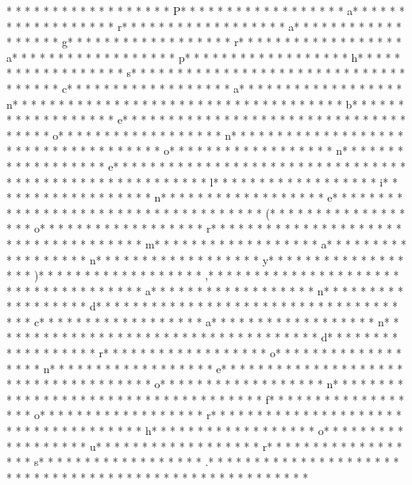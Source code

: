 * * *  * * *  * * *  *  * * *  *  * * *  * P* * *  * * *  * * *  *  * * *  *  * * *  * a* * *  * * *  * * *  *  * * *  *  * * *  * r* * *  * * *  * * *  *  * * *  *  * * *  * a* * *  * * *  * * *  *  * * *  *  * * *  * g* * *  * * *  * * *  *  * * *  *  * * *  * r* * *  * * *  * * *  *  * * *  *  * * *  * a* * *  * * *  * * *  *  * * *  *  * * *  * p* * *  * * *  * * *  *  * * *  *  * * *  * h* * *  * * *  * * *  *  * * *  *  * * *  * s* * *  * * *  * * *  *  * * *  *  * * *  *  * * *  * * *  * * *  *  * * *  *  * * *  * c* * *  * * *  * * *  *  * * *  *  * * *  * a* * *  * * *  * * *  *  * * *  *  * * *  * n* * *  * * *  * * *  *  * * *  *  * * *  *  * * *  * * *  * * *  *  * * *  *  * * *  * b* * *  * * *  * * *  *  * * *  *  * * *  * e* * *  * * *  * * *  *  * * *  *  * * *  *  * * *  * * *  * * *  *  * * *  *  * * *  * o* * *  * * *  * * *  *  * * *  *  * * *  * n* * *  * * *  * * *  *  * * *  *  * * *  *  * * *  * * *  * * *  *  * * *  *  * * *  * o* * *  * * *  * * *  *  * * *  *  * * *  * n* * *  * * *  * * *  *  * * *  *  * * *  * e* * *  * * *  * * *  *  * * *  *  * * *  *  * * *  * * *  * * *  *  * * *  *  * * *  * 
* * *  * * *  * * *  *  * * *  *  * * *  * l* * *  * * *  * * *  *  * * *  *  * * *  * i* * *  * * *  * * *  *  * * *  *  * * *  * n* * *  * * *  * * *  *  * * *  *  * * *  * e* * *  * * *  * * *  *  * * *  *  * * *  *  * * *  * * *  * * *  *  * * *  *  * * *  * (* * *  * * *  * * *  *  * * *  *  * * *  * o* * *  * * *  * * *  *  * * *  *  * * *  * r* * *  * * *  * * *  *  * * *  *  * * *  *  * * *  * * *  * * *  *  * * *  *  * * *  * m* * *  * * *  * * *  *  * * *  *  * * *  * a* * *  * * *  * * *  *  * * *  *  * * *  * n* * *  * * *  * * *  *  * * *  *  * * *  * y* * *  * * *  * * *  *  * * *  *  * * *  * )* * *  * * *  * * *  *  * * *  *  * * *  * ,* * *  * * *  * * *  *  * * *  *  * * *  *  * * *  * * *  * * *  *  * * *  *  * * *  * a* * *  * * *  * * *  *  * * *  *  * * *  * n* * *  * * *  * * *  *  * * *  *  * * *  * d* * *  * * *  * * *  *  * * *  *  * * *  *  * * *  * * *  * * *  *  * * *  *  * * *  * c* * *  * * *  * * *  *  * * *  *  * * *  * a* * *  * * *  * * *  *  * * *  *  * * *  * n* * *  * * *  * * *  *  * * *  *  * * *  *  * * *  * * *  * * *  *  * * *  *  * * *  * d* * *  * * *  * * *  *  * * *  *  * * *  * r* * *  * * *  * * *  *  * * *  *  * * *  * o* * *  * * *  * * *  *  * * *  *  * * *  * n* * *  * * *  * * *  *  * * *  *  * * *  * e* * *  * * *  * * *  *  * * *  *  * * *  *  * * *  * * *  * * *  *  * * *  *  * * *  * o* * *  * * *  * * *  *  * * *  *  * * *  * n* * *  * * *  * * *  *  * * *  *  * * *  *  * * *  * * *  * * *  *  * * *  *  * * *  * f* * *  * * *  * * *  *  * * *  *  * * *  * o* * *  * * *  * * *  *  * * *  *  * * *  * r* * *  * * *  * * *  *  * * *  *  * * *  *  * * *  * * *  * * *  *  * * *  *  * * *  * h* * *  * * *  * * *  *  * * *  *  * * *  * o* * *  * * *  * * *  *  * * *  *  * * *  * u* * *  * * *  * * *  *  * * *  *  * * *  * r* * *  * * *  * * *  *  * * *  *  * * *  * s* * *  * * *  * * *  *  * * *  *  * * *  * .* * *  * * *  * * *  *  * * *  *  * * *  *  * * *  * * *  * * *  *  * * *  *  * * *  *  * * *  * * *  * * *  *  * * *  *  * * *  * 
